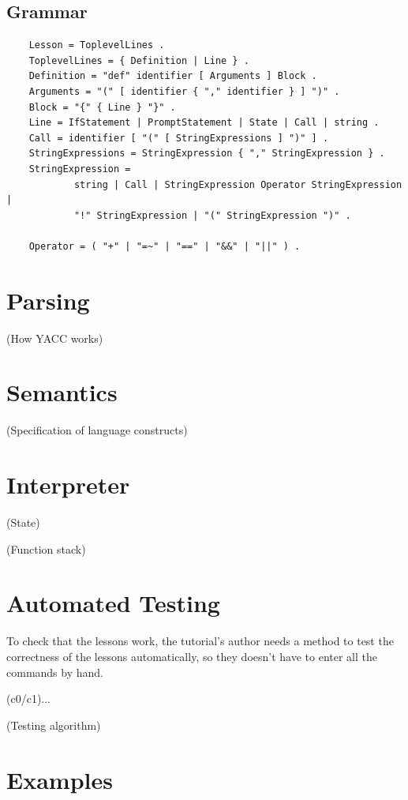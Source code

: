 \documentclass[paper=a4,abstract=on,cleardoublepage=empty,numbers=noenddot,toc=bib]{scrreprt}
\begin{document}
\subsection{Grammar}

\begin{lstlisting}
    Lesson = ToplevelLines .
    ToplevelLines = { Definition | Line } .
    Definition = "def" identifier [ Arguments ] Block .
    Arguments = "(" [ identifier { "," identifier } ] ")" .
    Block = "{" { Line } "}" .
    Line = IfStatement | PromptStatement | State | Call | string .
    Call = identifier [ "(" [ StringExpressions ] ")" ] .
    StringExpressions = StringExpression { "," StringExpression } .
    StringExpression =
            string | Call | StringExpression Operator StringExpression |
            "!" StringExpression | "(" StringExpression ")" .

    Operator = ( "+" | "=~" | "==" | "&&" | "||" ) .
\end{lstlisting}

\section{Parsing}

(How YACC works)

\section{Semantics}

(Specification of language constructs)

\section{Interpreter}

(State)

(Function stack)

\section{Automated Testing}

To check that the lessons work, the tutorial's author needs a method to test the correctness of the lessons automatically, so they doesn't have to enter all the commands by hand.

(c0/c1)...

(Testing algorithm)

\section{Examples}
\end{document}
